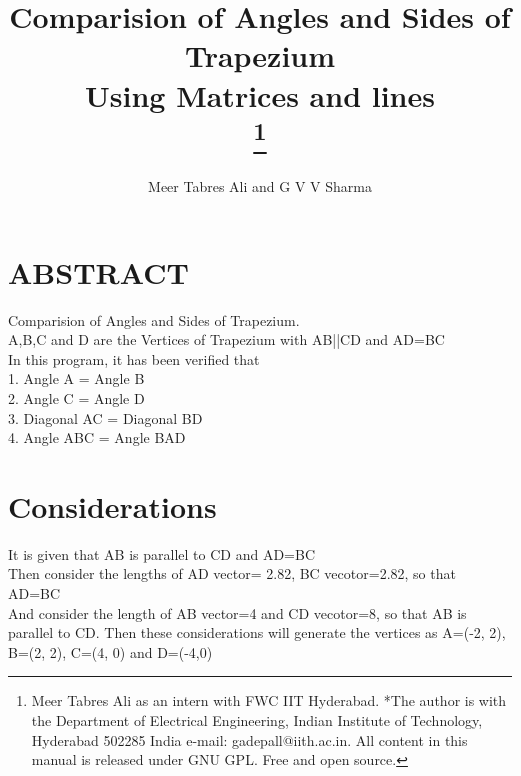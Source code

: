 \documentclass[conference]{IEEEtran}
\begin{document}
\title{
{Comparision of Angles and Sides of Trapezium\\
Using Matrices and lines}\\

\thanks{Meer Tabres Ali as an intern with FWC IIT Hyderabad. *The author is with the Department of Electrical Engineering, Indian Institute of Technology, Hyderabad 502285 India e-mail: gadepall@iith.ac.in. All content in this manual is released under GNU GPL. Free and open source.}
}
\author{Meer Tabres Ali and G V V Sharma}
\maketitle

\section{ABSTRACT}
\begin{flushleft}
Comparision of Angles and Sides of Trapezium.\\
A,B,C and D are the Vertices of Trapezium with AB||CD and AD=BC\\
\vspace{0.7cm}
In this program, it has been verified that\\
1. Angle A = Angle B\\
2. Angle C = Angle D\\
3. Diagonal AC = Diagonal BD\\
4. Angle ABC  = Angle BAD \\

\end{flushleft}

\vspace{1cm}
\section{Considerations}
\vspace{1cm}
\begin{flushleft}
It is given that AB is parallel to CD and AD=BC \\
Then consider the lengths of AD vector= 2.82, BC vecotor=2.82, so that AD=BC \\
And consider the length of AB vector=4 and CD vecotor=8, so that AB is parallel to CD.
Then these considerations will generate the vertices as A=(-2, 2), B=(2, 2), C=(4, 0) and D=(-4,0) \\
\end{flushleft}
\end{document}

